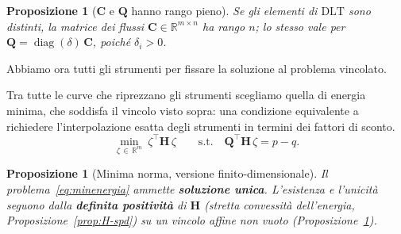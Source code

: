 \documentclass[11pt,a4paper]{article}
\theoremstyle{plain}
\newtheorem{proposizione}[teorema]{Proposizione}
\theoremstyle{definition}
\theoremstyle{remark}
\newcommand{\DLT}{\mathrm{DLT}}
\newcommand{\Qmat}{\mathbf{Q}}
\newcommand{\Hmat}{\mathbf{H}}
\newcommand{\transp}{^{\!\top}}
\begin{document}
\begin{proposizione}[$\mathbf{C}$ e $\Qmat$ hanno rango pieno]
\label{prop:rango}
Se gli elementi di $\DLT$ sono distinti, la matrice dei flussi
$\mathbf{C}\in\mathbb{R}^{m\times n}$ ha rango $n$; lo stesso vale per
$\Qmat=\operatorname{diag}(\delta)\,\mathbf{C}$, poich\'e $\delta_i>0$.
\end{proposizione}


Abbiamo ora tutti gli strumenti per fissare la soluzione al problema vincolato.

Tra tutte le curve che riprezzano gli strumenti scegliamo quella di energia minima, che
soddisfa il vincolo visto sopra: una condizione equivalente a richiedere l'interpolazione
esatta degli strumenti in termini dei fattori di sconto.
\begin{equation}
  \min_{\zeta\,\in\,\mathbb{R}^m} \ \zeta\transp \Hmat\, \zeta
  \qquad \text{s.t.}\quad
  \Qmat\transp \Hmat\, \zeta = p - q .
  \label{eq:minenergia}
\end{equation}

\begin{proposizione}[Minima norma, versione finito-dimensionale]
\label{prop:minnorm-finita}
Il problema~\eqref{eq:minenergia} ammette \textbf{soluzione unica}. L'esistenza e
l'unicit\`a seguono dalla \textbf{definita positivit\`a} di $\Hmat$ (stretta
convessit\`a dell'energia, Proposizione~\ref{prop:H-spd}) su un vincolo affine non vuoto
(Proposizione~\ref{prop:rango}).
\end{proposizione}
\end{document}
